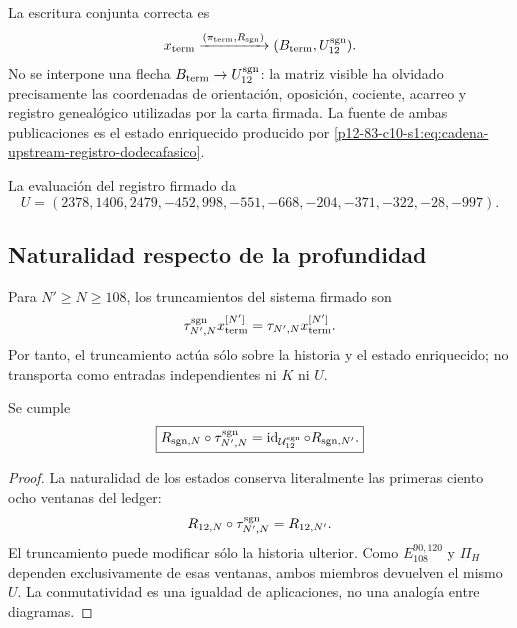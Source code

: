 La escritura conjunta correcta es
\begin{equation}
 x_{\rm term}
 \xrightarrow{(\pi_{\rm term},R_{\rm sgn})}
 (B_{\rm term},U_{12}^{\rm sgn}).
 \label{p12-83-c10-s1:eq:doble-publicacion-terminal}
\end{equation}
No se interpone una flecha
\(B_{\rm term}\to U_{12}^{\rm sgn}\): la matriz visible ha olvidado
precisamente las coordenadas de orientación, oposición, cociente, acarreo y
registro genealógico utilizadas por la carta firmada. La fuente de ambas publicaciones es
el estado enriquecido producido por \eqref{p12-83-c10-s1:eq:cadena-upstream-registro-dodecafasico}.

La evaluación del registro firmado da
\begin{equation}
 \boxed{
 U=(2378,1406,2479,-452,998,-551,
 -668,-204,-371,-322,-28,-997).}
 \label{p12-83-c10-s1:eq:vector-u-firmado-autonomo}
\end{equation}

\subsection{Naturalidad respecto de la profundidad}

Para \(N'\geq N\geq108\), los truncamientos del sistema firmado son
\begin{equation}
 \tau_{N',N}^{\rm sgn}
 x_{\rm term}^{[N']}
 =\tau_{N',N}x_{\rm term}^{[N']}.
 \label{p12-83-c10-s1:eq:truncamiento-preserva-ku-autonomo}
\end{equation}
Por tanto, el truncamiento actúa sólo sobre la historia y el estado
enriquecido; no transporta como entradas independientes ni \(K\) ni \(U\).

\begin{theorem}
\label{p12-83-c10-s1:thm:naturalidad-lector-firmado-autonomo}
Se cumple
\begin{equation}
 \boxed{
 R_{{\rm sgn},N}\circ\tau_{N',N}^{\rm sgn}
 =\operatorname{id}_{\mathcal U_{12}^{\rm sgn}}
  \circ R_{{\rm sgn},N'}.}
 \label{p12-83-c10-s1:eq:cuadrado-naturalidad-lector-firmado}
\end{equation}
\end{theorem}

\begin{proof}
La naturalidad de los estados conserva literalmente las primeras ciento ocho
ventanas del ledger:
\[
 R_{12,N}\circ\tau_{N',N}^{\rm sgn}=R_{12,N'}.
\]
El truncamiento puede modificar sólo la historia ulterior. Como
\(E_{108}^{90,120}\) y \(\Pi_H\) dependen exclusivamente de esas ventanas,
ambos miembros devuelven el mismo \(U\). La conmutatividad es una igualdad de
aplicaciones, no una analogía entre diagramas.
\end{proof}

